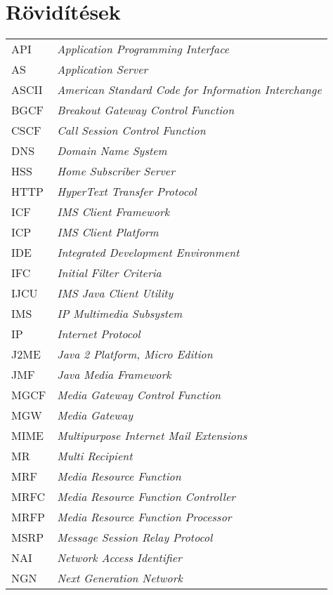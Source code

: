 

\section*{Rövidítések}
\label{sec:roviditesek}

\begin{tabular}{p{2cm}l}
API & \emph{Application Programming Interface} \\
AS & \emph{Application Server} \\
ASCII & \emph{American Standard Code for Information Interchange} \\
BGCF & \emph{Breakout Gateway Control Function} \\
CSCF & \emph{Call Session Control Function} \\
DNS & \emph{Domain Name System} \\
HSS & \emph{Home Subscriber Server} \\
HTTP & \emph{HyperText Transfer Protocol} \\
ICF & \emph{IMS Client Framework} \\
ICP & \emph{IMS Client Platform} \\
IDE & \emph{Integrated Development Environment} \\
IFC & \emph{Initial Filter Criteria} \\
IJCU & \emph{IMS Java Client Utility} \\
IMS & \emph{IP Multimedia Subsystem} \\
IP & \emph{Internet Protocol} \\
J2ME & \emph{Java 2 Platform, Micro Edition} \\
JMF & \emph{Java Media Framework} \\
MGCF & \emph{Media Gateway Control Function} \\
MGW & \emph{Media Gateway} \\
MIME & \emph{Multipurpose Internet Mail Extensions} \\
MR & \emph{Multi Recipient} \\
MRF & \emph{Media Resource Function} \\
MRFC & \emph{Media Resource Function Controller} \\
MRFP & \emph{Media Resource Function Processor} \\
MSRP & \emph{Message Session Relay Protocol} \\
NAI & \emph{Network Access Identifier} \\
NGN & \emph{Next Generation Network} \\

\end{tabular}
